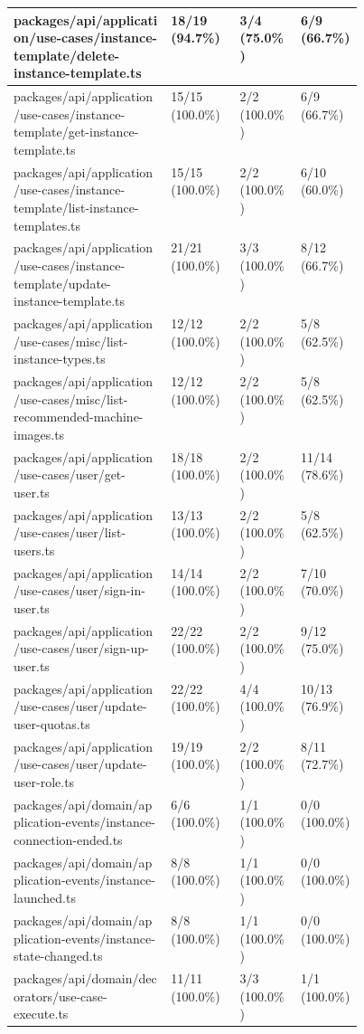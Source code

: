 \begin{longtable}{@{\extracolsep{\fill}}p{0.45\linewidth}lll}
packages/api/application/use-cases/instance-template/delete-instance-template.ts & 18/19 (94.7\%) & 3/4 (75.0\%) & 6/9 (66.7\%) \\ \hline
packages/api/application/use-cases/instance-template/get-instance-template.ts & 15/15 (100.0\%) & 2/2 (100.0\%) & 6/9 (66.7\%) \\ \hline
packages/api/application/use-cases/instance-template/list-instance-templates.ts & 15/15 (100.0\%) & 2/2 (100.0\%) & 6/10 (60.0\%) \\ \hline
packages/api/application/use-cases/instance-template/update-instance-template.ts & 21/21 (100.0\%) & 3/3 (100.0\%) & 8/12 (66.7\%) \\ \hline
packages/api/application/use-cases/misc/list-instance-types.ts & 12/12 (100.0\%) & 2/2 (100.0\%) & 5/8 (62.5\%) \\ \hline
packages/api/application/use-cases/misc/list-recommended-machine-images.ts & 12/12 (100.0\%) & 2/2 (100.0\%) & 5/8 (62.5\%) \\ \hline
packages/api/application/use-cases/user/get-user.ts & 18/18 (100.0\%) & 2/2 (100.0\%) & 11/14 (78.6\%) \\ \hline
packages/api/application/use-cases/user/list-users.ts & 13/13 (100.0\%) & 2/2 (100.0\%) & 5/8 (62.5\%) \\ \hline
packages/api/application/use-cases/user/sign-in-user.ts & 14/14 (100.0\%) & 2/2 (100.0\%) & 7/10 (70.0\%) \\ \hline
packages/api/application/use-cases/user/sign-up-user.ts & 22/22 (100.0\%) & 2/2 (100.0\%) & 9/12 (75.0\%) \\ \hline
packages/api/application/use-cases/user/update-user-quotas.ts & 22/22 (100.0\%) & 4/4 (100.0\%) & 10/13 (76.9\%) \\ \hline
packages/api/application/use-cases/user/update-user-role.ts & 19/19 (100.0\%) & 2/2 (100.0\%) & 8/11 (72.7\%) \\ \hline
packages/api/domain/application-events/instance-connection-ended.ts & 6/6 (100.0\%) & 1/1 (100.0\%) & 0/0 (100.0\%) \\ \hline
packages/api/domain/application-events/instance-launched.ts & 8/8 (100.0\%) & 1/1 (100.0\%) & 0/0 (100.0\%) \\ \hline
packages/api/domain/application-events/instance-state-changed.ts & 8/8 (100.0\%) & 1/1 (100.0\%) & 0/0 (100.0\%) \\ \hline
packages/api/domain/decorators/use-case-execute.ts & 11/11 (100.0\%) & 3/3 (100.0\%) & 1/1 (100.0\%) \\ \hline

\end{longtable}
